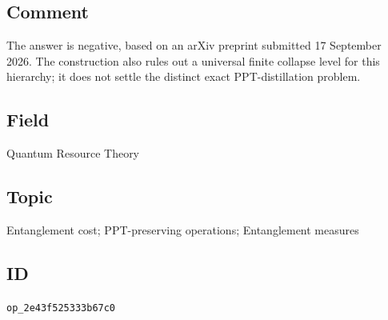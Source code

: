 \subsection*{Comment}

The answer is negative, based on an arXiv preprint submitted 17 September 2026. The construction also rules out a universal finite collapse level for this hierarchy; it does not settle the distinct exact PPT-distillation problem.

\subsection*{Field}

Quantum Resource Theory

\subsection*{Topic}

Entanglement cost; PPT-preserving operations; Entanglement measures

\subsection*{ID}

\texttt{op\_2e43f525333b67c0}
